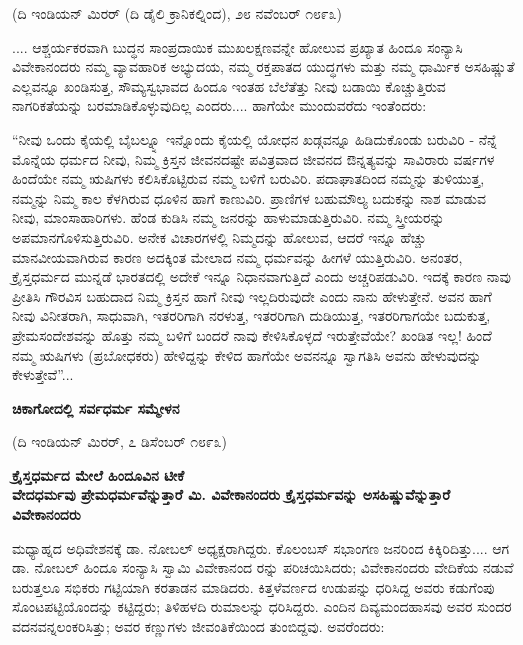 \begin{center}
(ದಿ ಇಂಡಿಯನ್ ಮಿರರ್ (ದಿ ಡೈಲಿ ಕ್ರಾನಿಕಲ್ನಿಂದ), ೨೮ ನವೆಂಬರ್ ೧೮೯೩)
\end{center}

.... ಆಶ್ಚರ್ಯಕರವಾಗಿ ಬುದ್ಧನ ಸಾಂಪ್ರದಾಯಿಕ ಮುಖಲಕ್ಷಣವನ್ನೇ ಹೋಲುವ ಪ್ರಖ್ಯಾತ ಹಿಂದೂ ಸಂನ್ಯಾಸಿ ವಿವೇಕಾನಂದರು ನಮ್ಮ ವ್ಯಾವಹಾರಿಕ ಅಭ್ಯುದಯ, ನಮ್ಮ ರಕ್ತಪಾತದ ಯುದ್ಧಗಳು ಮತ್ತು ನಮ್ಮ ಧಾರ್ಮಿಕ ಅಸಹಿಷ್ಣುತೆ ಎಲ್ಲವನ್ನೂ ಖಂಡಿಸುತ್ತ, ಸೌಮ್ಯಸ್ವಭಾವದ ಹಿಂದೂ ಇಂತಹ ಬೆಲೆತೆತ್ತು ನೀವು ಬಡಾಯಿ ಕೊಚ್ಚುತ್ತಿರುವ ನಾಗರಿಕತೆಯನ್ನು ಬರಮಾಡಿಕೊಳ್ಳುವುದಿಲ್ಲ ಎಂದರು.... ಹಾಗೆಯೇ ಮುಂದುವರೆದು ಇಂತೆಂದರು:

“ನೀವು ಒಂದು ಕೈಯಲ್ಲಿ ಬೈಬಲ್ನ್ನೂ ಇನ್ನೊಂದು ಕೈಯಲ್ಲಿ ಯೋಧನ ಖಡ್ಗವನ್ನೂ ಹಿಡಿದುಕೊಂಡು ಬರುವಿರಿ - ನೆನ್ನೆ ಮೊನ್ನೆಯ ಧರ್ಮದ ನೀವು, ನಿಮ್ಮ ಕ್ರಿಸ್ತನ ಜೀವನದಷ್ಟೇ ಪವಿತ್ರವಾದ ಜೀವನದ ಔನ್ನತ್ಯವನ್ನು ಸಾವಿರಾರು ವರ್ಷಗಳ ಹಿಂದೆಯೇ ನಮ್ಮ ಋಷಿಗಳು ಕಲಿಸಿಕೊಟ್ಟಿರುವ ನಮ್ಮ ಬಳಿಗೆ ಬರುವಿರಿ. ಪದಾಘಾತದಿಂದ ನಮ್ಮನ್ನು ತುಳಿಯುತ್ತ, ನಮ್ಮನ್ನು ನಿಮ್ಮ ಕಾಲ ಕೆಳಗಿರುವ ಧೂಳಿನ ಹಾಗೆ ಕಾಣುವಿರಿ. ಪ್ರಾಣಿಗಳ ಬಹುಮೌಲ್ಯ ಬದುಕನ್ನು ನಾಶ ಮಾಡುವ ನೀವು, ಮಾಂಸಾಹಾರಿಗಳು. ಹೆಂಡ ಕುಡಿಸಿ ನಮ್ಮ ಜನರನ್ನು ಹಾಳುಮಾಡುತ್ತಿರುವಿರಿ. ನಮ್ಮ ಸ್ತ್ರೀಯರನ್ನು ಅಪಮಾನಗೊಳಿಸುತ್ತಿರುವಿರಿ. ಅನೇಕ ವಿಚಾರಗಳಲ್ಲಿ ನಿಮ್ಮದನ್ನು ಹೋಲುವ, ಆದರೆ ಇನ್ನೂ ಹೆಚ್ಚು ಮಾನವೀಯವಾಗಿರುವ ಕಾರಣ ಅದಕ್ಕಿಂತ ಮೇಲಾದ ನಮ್ಮ ಧರ್ಮವನ್ನು ಹೀಗಳೆ ಯುತ್ತಿರುವಿರಿ. ಅನಂತರ, ಕ್ರೈಸ್ತಧರ್ಮದ ಮುನ್ನಡೆ ಭಾರತದಲ್ಲಿ ಅದೇಕೆ ಇನ್ನೂ ನಿಧಾನವಾಗುತ್ತಿದೆ ಎಂದು ಅಚ್ಚರಿಪಡುವಿರಿ. ಇದಕ್ಕೆ ಕಾರಣ ನಾವು ಪ್ರೀತಿಸಿ ಗೌರವಿಸ ಬಹುದಾದ ನಿಮ್ಮ ಕ್ರಿಸ್ತನ ಹಾಗೆ ನೀವು ಇಲ್ಲದಿರುವುದೇ ಎಂದು ನಾನು ಹೇಳುತ್ತೇನೆ. ಅವನ ಹಾಗೆ ನೀವು ವಿನೀತರಾಗಿ, ಸಾಧುವಾಗಿ, ಇತರರಿಗಾಗಿ ನರಳುತ್ತ, ಇತರರಿಗಾಗಿ ದುಡಿಯುತ್ತ, ಇತರರಿಗಾಗಯೇ ಬದುಕುತ್ತ, ಪ್ರೇಮಸಂದೇಶವನ್ನು ಹೊತ್ತು ನಮ್ಮ ಬಳಿಗೆ ಬಂದರೆ ನಾವು ಕೇಳಿಸಿಕೊಳ್ಳದೆ ಇರುತ್ತೇವೆಯೇ? ಖಂಡಿತ ಇಲ್ಲ! ಹಿಂದೆ ನಮ್ಮ ಋಷಿಗಳು (ಪ್ರಬೋಧಕರು) ಹೇಳಿದ್ದನ್ನು ಕೇಳಿದ ಹಾಗೆಯೇ ಅವನನ್ನೂ ಸ್ವಾಗತಿಸಿ ಅವನು ಹೇಳುವುದನ್ನು ಕೇಳುತ್ತೇವೆ”...

\begin{center}
\textbf{ಚಿಕಾಗೋದಲ್ಲಿ ಸರ್ವಧರ್ಮ ಸಮ್ಮೇಳನ}
\end{center}

\begin{center}
(ದಿ ಇಂಡಿಯನ್ ಮಿರರ್, ೭ ಡಿಸೆಂಬರ್ ೧೮೯೩)
\end{center}

\begin{center}
\textbf{ಕ್ರೈಸ್ತಧರ್ಮದ ಮೇಲೆ ಹಿಂದೂವಿನ ಟೀಕೆ\\ವೇದಧರ್ಮವು ಪ್ರೇಮಧರ್ಮವೆನ್ನುತ್ತಾರೆ ಮಿ. ವಿವೇಕಾನಂದರು ಕ್ರೈಸ್ತಧರ್ಮವನ್ನು ಅಸಹಿಷ್ಣುವೆನ್ನುತ್ತಾರೆ ವಿವೇಕಾನಂದರು}
\end{center}

ಮಧ್ಯಾಹ್ನದ ಅಧಿವೇಶನಕ್ಕೆ ಡಾ. ನೋಬಲ್ ಅಧ್ಯಕ್ಷರಾಗಿದ್ದರು. ಕೊಲಂಬಸ್ ಸಭಾಂಗಣ ಜನರಿಂದ ಕಿಕ್ಕಿರಿದಿತ್ತು.... ಆಗ ಡಾ. ನೋಬಲ್ ಹಿಂದೂ ಸಂನ್ಯಾಸಿ ಸ್ವಾಮಿ ವಿವೇಕಾನಂದ ರನ್ನು ಪರಿಚಯಿಸಿದರು; ವಿವೇಕಾನಂದರು ವೇದಿಕೆಯ ನಡುವೆ ಬರುತ್ತಲೂ ಸಭಿಕರು ಗಟ್ಟಿಯಾಗಿ ಕರತಾಡನ ಮಾಡಿದರು. ಕಿತ್ತಳೆವರ್ಣದ ಉಡುಪನ್ನು ಧರಿಸಿದ್ದ ಅವರು ಕಡುಗೆಂಪು ಸೊಂಟಪಟ್ಟಿಯೊಂದನ್ನು ಕಟ್ಟಿದ್ದರು; ತಿಳಿಹಳದಿ ರುಮಾಲನ್ನು ಧರಿಸಿದ್ದರು. ಎಂದಿನ ದಿವ್ಯಮಂದಹಾಸವು ಅವರ ಸುಂದರ ವದನವನ್ನಲಂಕರಿಸಿತ್ತು; ಅವರ ಕಣ್ಣುಗಳು ಜೀವಂತಿಕೆಯಿಂದ ತುಂಬಿದ್ದವು. ಅವರೆಂದರು:

